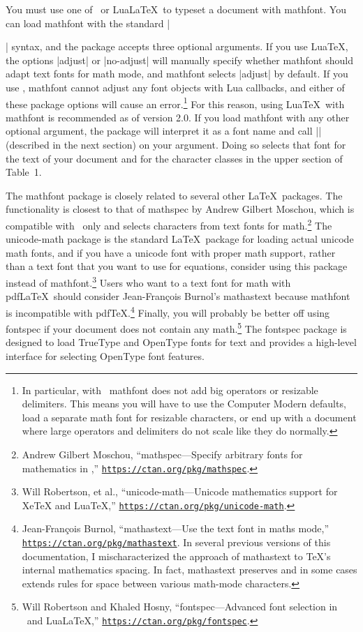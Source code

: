 \documentclass[12pt,twoside]{article}
\def\link#1{\href{#1}{\nolinkurl{#1}}}
\begin{document}
You must use one of \XeLaTeX\ or Lua\LaTeX\ to typeset a document with \textsf{mathfont}. You can load \textsf{mathfont} with the standard |\usepackage{mathfont}| syntax, and the package accepts three optional arguments. If you use Lua\TeX, the options |adjust| or |no-adjust| will manually specify whether \textsf{mathfont} should adapt text fonts for math mode, and \textsf{mathfont} selects |adjust| by default. If you use \XeTeX, \textsf{mathfont} cannot adjust any font objects with Lua callbacks, and either of these package options will cause an error.\footnote{In particular, with \XeLaTeX\ \textsf{mathfont} does not add big operators or resizable delimiters. This means you will have to use the Computer Modern defaults, load a separate math font for resizable characters, or end up with a document where large operators and delimiters do not scale like they do normally.} For this reason, using Lua\TeX\ with \textsf{mathfont} is recommended as of version 2.0. If you load \textsf{mathfont} with any other optional argument, the package will interpret it as a font name and call |\setfont| (described in the next section) on your argument. Doing so selects that font for the text of your document and for the character classes in the upper section of Table~1.

The \textsf{mathfont} package is closely related to several other \LaTeX\ packages. The functionality is closest to that of \textsf{mathspec} by Andrew Gilbert Moschou, which is compatible with \XeTeX\ only and selects characters from text fonts for math.\footnote{Andrew Gilbert Moschou, ``\textsf{mathspec}---Specify arbitrary fonts for mathematics in \XeTeX,'' \link{https://ctan.org/pkg/mathspec}.} The \textsf{unicode-math} package is the standard \LaTeX\ package for loading actual unicode math fonts, and if you have a unicode font with proper math support, rather than a text font that you want to use for equations, consider using this package instead of \textsf{mathfont}.\footnote{Will Robertson, et al., ``\textsf{unicode-math}---Unicode mathematics support for XeTeX and LuaTeX,'' \link{https://ctan.org/pkg/unicode-math}.} Users who want to a text font for math with pdf\LaTeX\ should consider Jean-Fran\c cois Burnol's \textsf{mathastext} because \textsf{mathfont} is incompatible with pdf\TeX.\footnote{Jean-Fran\c cois Burnol, ``\textsf{mathastext}---Use the text font in maths mode,'' \link{https://ctan.org/pkg/mathastext}. In several previous versions of this documentation, I mischaracterized the approach of \textsf{mathastext} to \TeX's internal mathematics spacing. In fact, \textsf{mathastext} preserves and in some cases extends rules for space between various math-mode characters.} Finally, you will probably be better off using \textsf{fontspec} if your document does not contain any math.\footnote{Will Robertson and Khaled Hosny, ``\textsf{fontspec}---Advanced font selection in \XeLaTeX\ and Lua\LaTeX,'' \link{https://ctan.org/pkg/fontspec}.} The \textsf{fontspec} package is designed to load TrueType and OpenType fonts for text and provides a high-level interface for selecting OpenType font features.
\end{document}
